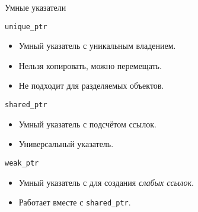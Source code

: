 \documentclass[aspectration=1610,t]{beamer}
\begin{document}
\begin{frame}[fragile]{Умные указатели}
\begin{block}{\texttt{unique\_ptr}}
\begin{itemize}
    \item Умный указатель с уникальным владением.
    \item Нельзя копировать, можно перемещать.
    \item Не подходит для разделяемых объектов.
\end{itemize}
\end{block}
\begin{block}{\texttt{shared\_ptr}}
\begin{itemize}
    \item Умный указатель с подсчётом ссылок.
    \item Универсальный указатель.
\end{itemize}
\end{block}
\begin{block}{\texttt{weak\_ptr}}
\begin{itemize}
    \item Умный указатель с для создания \emph{слабых ссылок}.
    \item Работает вместе с \texttt{shared\_ptr}.
\end{itemize}
\end{block}
\end{frame}
\end{document}
